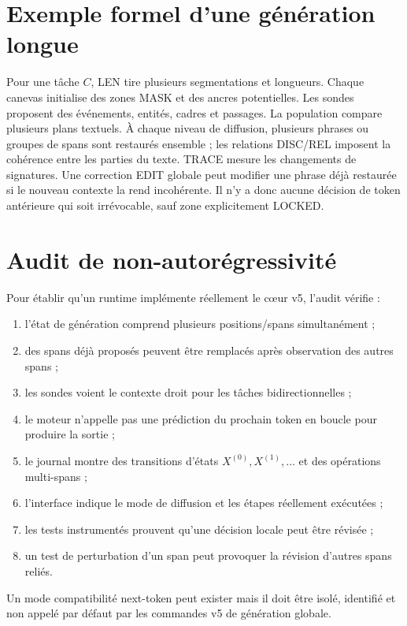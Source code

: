 \documentclass[11pt,a4paper,oneside]{report}
\begin{document}
\chapter{Exemple formel d'une génération longue}
Pour une tâche $C$, LEN tire plusieurs segmentations et longueurs. Chaque canevas initialise des zones MASK et des ancres potentielles. Les sondes proposent des événements, entités, cadres et passages. La population compare plusieurs plans textuels. À chaque niveau de diffusion, plusieurs phrases ou groupes de spans sont restaurés ensemble ; les relations DISC/REL imposent la cohérence entre les parties du texte. TRACE mesure les changements de signatures. Une correction EDIT globale peut modifier une phrase déjà restaurée si le nouveau contexte la rend incohérente. Il n'y a donc aucune décision de token antérieure qui soit irrévocable, sauf zone explicitement LOCKED.

\chapter{Audit de non-autorégressivité}
Pour établir qu'un runtime implémente réellement le cœur v5, l'audit vérifie :
\begin{enumerate}
\item l'état de génération comprend plusieurs positions/spans simultanément ;
\item des spans déjà proposés peuvent être remplacés après observation des autres spans ;
\item les sondes voient le contexte droit pour les tâches bidirectionnelles ;
\item le moteur n'appelle pas une prédiction du prochain token en boucle pour produire la sortie ;
\item le journal montre des transitions d'états $X^{(0)},X^{(1)},\ldots$ et des opérations multi-spans ;
\item l'interface indique le mode de diffusion et les étapes réellement exécutées ;
\item les tests instrumentés prouvent qu'une décision locale peut être révisée ;
\item un test de perturbation d'un span peut provoquer la révision d'autres spans reliés.
\end{enumerate}
Un mode compatibilité next-token peut exister mais il doit être isolé, identifié et non appelé par défaut par les commandes v5 de génération globale.
\end{document}
